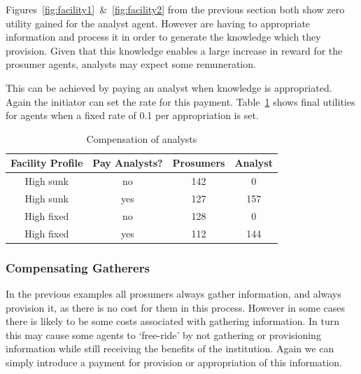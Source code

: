 Figures~\ref{fig:facility1}~\&~\ref{fig:facility2} from the previous section both show zero utility gained for the analyst agent. However are having to appropriate information and process it in order to generate the knowledge which they provision. Given that this knowledge enables a large increase in reward for the prosumer agents, analysts may expect some remuneration.

This can be achieved by paying an analyst when knowledge is appropriated. Again the initiator can set the rate for this payment. Table~\ref{tab:analyst1} shows final utilities for agents when a fixed rate of 0.1 per appropriation is set.

\begin{table}
\centering
\begin{tabular}{c|c||c|c}
Facility Profile & Pay Analysts? & Prosumers & Analyst \\ 
\hline \hline
High sunk & no & 142 & 0 \\ 
\hline 
High sunk & yes & 127 & 157 \\ 
\hline 
High fixed & no & 128 & 0 \\ 
\hline 
High fixed & yes & 112 & 144 \\ 
\end{tabular}
\caption{Compensation of analysts}\label{tab:analyst1}
\end{table} 

\subsubsection{Compensating Gatherers}

In the previous examples all prosumers always gather information, and always provision it, as there is no cost for them in this process. However in some cases there is likely to be some costs associated with gathering information. In turn this may cause some agents to `free-ride' by not gathering or provisioning information while still receiving the benefits of the institution. Again we can simply introduce a payment for provision or appropriation of this information.


